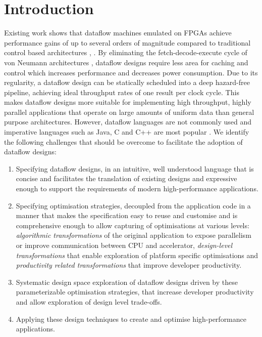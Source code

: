 \section{Introduction}

Existing work shows that dataflow machines emulated on FPGAs achieve
performance gains of up to several orders of magnitude compared to
traditional control based architectures \cite{Flynn:Pell:Mencer:2012},
\cite{Mencer:2012}. By eliminating the fetch-decode-execute cycle of
von Neumann architectures \cite{Neumann:1993}, dataflow designs
require less area for caching and control which increases performance
and decreases power consumption. Due to its regularity, a dataflow
design can be statically scheduled into a deep hazard-free pipeline,
achieving ideal throughput rates of one result per clock cycle. This
makes dataflow designs more suitable for implementing high throughput,
highly parallel applications that operate on large amounts of uniform
data than general purpose architectures. However, dataflow languages
are not commonly used and imperative languages such as Java, C and C++
are most popular \cite{Tiobe:2012}. We identify the following
challenges that should be overcome to facilitate the adoption of
dataflow designs:
\begin{enumerate}
\item Specifying dataflow designs, in an intuitive, well understood
  language that is concise and facilitates the translation of existing
  designs and expressive enough to support the requirements of modern
  high-performance applications.
\item Specifying optimisation strategies, decoupled from the
  application code in a manner that makes the specification easy to
  reuse and customise and is comprehensive enough to allow capturing
  of optimisations at various levels: \emph{algorithmic
    transformations} of the original application to expose parallelism
  or improve communication between CPU and accelerator,
  \emph{design-level transformations} that enable exploration of
  platform specific optimisations and \emph{productivity related
    transformations} that improve developer productivity.
\item Systematic design space exploration of dataflow designs driven
  by these parameterizable optimisation strategies, that increase
  developer productivity and allow exploration of design level
  trade-offs.
\item Applying these design techniques to create and optimise
  high-performance applications.
\end{enumerate}

